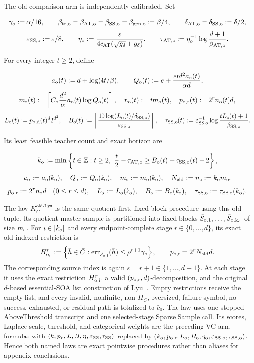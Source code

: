 The old comparison arm is independently calibrated.  Set

\[
 \gamma_{\rm o}:=\alpha/16,
 \qquad
 \beta_{\rm tr,o}=\beta_{\rm AT,o}=\beta_{\rm SS,o}
 =\beta_{\rm gen,o}:=\beta/4,
 \qquad
 \delta_{\rm AT,o}=\delta_{\rm SS,o}:=\delta/2,
\]
\[
 \varepsilon_{\rm SS,o}:=\varepsilon/8,
 \qquad
 \eta_{\rm o}:=\frac{\varepsilon}
 {4c_{\rm AT}(\sqrt{g_\delta}+g_\delta)},
 \qquad
 \tau_{\rm AT,o}:=\eta_{\rm o}^{-1}
 \log\frac{d+1}{\beta_{\rm AT,o}}.
\]

For every integer $t\ge2$, define

\[
 a_{\rm o}(t):=d+\log(4t/\beta),
 \qquad
 Q_{\rm o}(t):=e+\frac{etd^2a_{\rm o}(t)}{\alpha d},
\]
\[
 m_{\rm o}(t):=\left\lceil C_{\rm o}\frac{d^2}{\alpha}
 a_{\rm o}(t)\log Q_{\rm o}(t)\right\rceil,
 \quad n_{\rm o}(t):=tm_{\rm o}(t),
 \quad p_{\rm o,r}(t):=2^rn_{\rm o}(t)d,
\]
\[
 L_{\rm o}(t):=p_{\rm o,d}(t)^d2^{d^2},
 \quad
 B_{\rm o}(t):=\left\lceil
 \frac{10\log(L_{\rm o}(t)/\delta_{\rm SS,o})}
 {\varepsilon_{\rm SS,o}}
 \right\rceil,
 \quad
 \tau_{\rm SS,o}(t):=\varepsilon_{\rm SS,o}^{-1}
 \log\frac{tL_{\rm o}(t)+1}{\beta_{\rm SS,o}}.
\]

Its least feasible teacher count and exact horizon are

\[
 k_{\rm o}:=\min\left\{t\in\mathbb Z:t\ge2,
 \ \frac t2-\tau_{\rm AT,o}
 \ge B_{\rm o}(t)+\tau_{\rm SS,o}(t)+2\right\},
\]
\[
 a_{\rm o}:=a_{\rm o}(k_{\rm o}),\quad
 Q_{\rm o}:=Q_{\rm o}(k_{\rm o}),\quad
 m_{\rm o}:=m_{\rm o}(k_{\rm o}),\quad
 N_{\rm old}:=n_{\rm o}:=k_{\rm o}m_{\rm o},
\]
\[
 p_{\rm o,r}:=2^rn_{\rm o}d\quad(0\le r\le d),\quad
 L_{\rm o}:=L_{\rm o}(k_{\rm o}),\quad
 B_{\rm o}:=B_{\rm o}(k_{\rm o}),\quad
 \tau_{\rm SS,o}:=\tau_{\rm SS,o}(k_{\rm o}).
\]

The law $K_C^{\mathrm{old\text{-}Lyu}}$ is the same quotient-first,
fixed-block procedure using this old tuple.  Its quotient master sample is
partitioned into fixed blocks $\bar S_{\rm o,1},\ldots,
\bar S_{\rm o,k_{\rm o}}$ of size $m_{\rm o}$.  For
$i\in[k_{\rm o}]$ and every endpoint-complete stage
$r\in\{0,\ldots,d\}$, its exact old-indexed restriction is
\[
 H_{\rm o,i}^r:=\left\{\bar h\in\bar C:
 \operatorname{err}_{\bar S_{\rm o,i}}(\bar h)
 \le\rho^{r+1}\gamma_{\rm o}\right\},
 \qquad p_{\rm o,r}=2^rN_{\rm old}d.
\]
The corresponding source index is again $s=r+1\in\{1,\ldots,d+1\}$.
At each stage it uses the exact restriction $H_{\rm o,i}^r$, a valid
$(p_{\rm o,r},d)$-decomposition, and the original $d$-based essential-SOA
list construction of Lyu~\citep[Definitions~4.2--4.3, Lemmas~4.1
and~4.3, Corollary~4.1, and Theorem~3]{lyu2025}.  Empty restrictions receive the empty
list, and every invalid, nonfinite, non-$H_C$, oversized, failure-symbol,
no-success, exhausted, or residual path is totalized to $\bar c_0$.  The
law uses one stopped AboveThreshold transcript and one selected-stage Sparse
Sample call. Its scores, Laplace scale, threshold, and categorical weights
are the preceding VC-arm formulas with
$(k,p_r,L,B,\eta,\varepsilon_{\rm SS},\tau_{\rm SS})$ replaced by
$(k_{\rm o},p_{\rm o,r},L_{\rm o},B_{\rm o},\eta_{\rm o},
\varepsilon_{\rm SS,o},\tau_{\rm SS,o})$.
Hence both named laws are exact pointwise procedures rather than aliases
for appendix conclusions.

